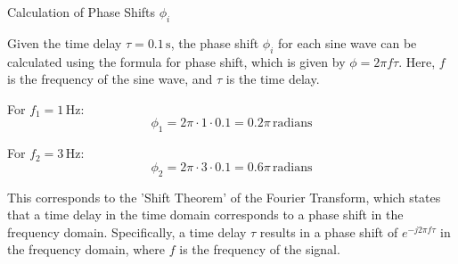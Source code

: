 
\item [a)]
Calculation of Phase Shifts $\phi_{i}$

Given the time delay $\tau = 0.1 \, \text{s}$, the phase shift $\phi_{i}$ for each sine wave can be calculated
using the formula for phase shift, which is given by $\phi = 2\pi f \tau$. Here, $f$ is the frequency of the sine wave,
and $\tau$ is the time delay.

For $f_{1} = 1 \, \text{Hz}$:
$$
\phi_{1} = 2\pi \cdot 1 \cdot 0.1 = 0.2\pi \, \text{radians}
$$

For $f_{2} = 3 \, \text{Hz}$:
$$
\phi_{2} = 2\pi \cdot 3 \cdot 0.1 = 0.6\pi \, \text{radians}
$$

This corresponds to the 'Shift Theorem' of the Fourier Transform, which states that a time delay in the time domain
corresponds to a phase shift in the frequency domain. Specifically, a time delay $\tau$ results in a phase shift
of $e^{-j2\pi f\tau}$ in the frequency domain, where $f$ is the frequency of the signal.
